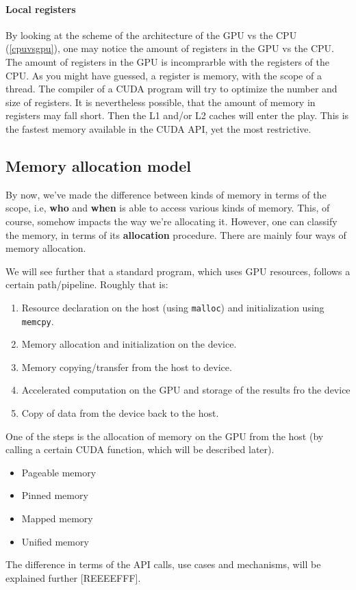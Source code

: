 \paragraph{Local registers}
By looking at the scheme of the architecture of the GPU vs the CPU (\autoref{cpuvsgpu}), one may notice the amount 
of registers in the GPU vs the CPU. The amount of registers in the GPU
is incomprarble with the registers of the CPU. As you might have guessed, a 
register is memory, with the scope of a thread. The compiler of a CUDA program will try to optimize the number and size of registers. 
It is nevertheless possible, that the amount of memory in registers may fall short. Then the L1 and/or L2 caches will enter the 
play. This is the fastest memory available in the CUDA API, yet the most restrictive.

\subsection{Memory allocation model}
\label{subsection:mem_alloc_model}
By now, we've made the difference between kinds of memory in terms of the scope, i.e, 
\textbf{who} and \textbf{when} is able to access various kinds of memory. This, of course, somehow impacts the way we're allocating it. 
However, one can classify the memory, in terms of its \textbf{allocation} procedure. There are mainly four ways of memory allocation.

We will see further that a standard
program, which uses GPU resources, follows a certain path/pipeline. 
Roughly that is: 
\begin{enumerate}
\setlength\itemsep{-0.1em}
  \item Resource declaration on the host (using \verb|malloc|) and initialization using \verb|memcpy|.
  \item Memory allocation and initialization on the device.
  \item Memory copying/transfer from the host to device.
  \item Accelerated computation on the GPU and storage of the results fro the device
  \item Copy of data from the device back to the host.
\end{enumerate}

One of the steps is the allocation of 
memory on the GPU from the host (by calling a certain CUDA function, which will be described later). 
\begin{itemize}
\setlength\itemsep{-0.1em}
   \item Pageable memory
   \item Pinned memory
   \item Mapped memory
   \item Unified memory
\end{itemize}
The difference in terms of the API calls, use cases and mechanisms, will be explained further [REEEEFFF]. 

















